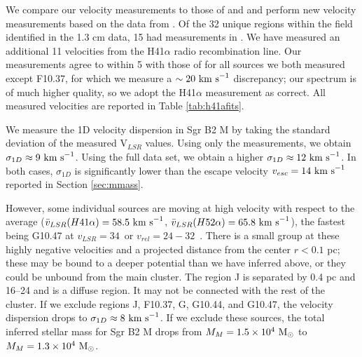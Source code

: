 \documentclass[twocolumn]{aastex62}
\begin{document}
We compare our velocity measurements to those of \citet{De-Pree2011a} and
\citet{De-Pree1996a} and perform  new velocity measurements based on the
data from \citet{Ginsburg2018a}.  Of the 32 unique \hii regions within the field
identified in the \citet{Gaume1995a} 1.3 cm data, 
15 had measurements in \citet{De-Pree2011a}.  We have measured an additional 11
velocities from the H41$\alpha$ radio recombination line.  Our measurements
agree to within 5 \kms with those of \citet{De-Pree2011a} for all sources we
both measured except F10.37, for which we measure a $\sim20~\textrm{km~s}^{-1}$ discrepancy;
our spectrum is of much higher quality, so we adopt the H41$\alpha$ measurement
as correct.  All measured velocities are reported in Table \ref{tab:h41afits}.

We measure the 1D velocity dispersion in Sgr B2 M by taking the standard
deviation of the measured V$_{LSR}$ values.  Using only the
\citet{De-Pree2011a} measurements, we obtain $\sigma_{1D}\approx9~\textrm{km~s}^{-1}$.  Using
the full data set, we obtain a higher $\sigma_{1D}\approx12~\textrm{km~s}^{-1}$.  In both
cases, $\sigma_{1D}$ is significantly lower than the escape velocity
$v_{esc}=14~\textrm{km~s}^{-1}$ reported in Section \ref{sec:mmass}.

However, some individual sources are moving at high velocity with respect to
the average ($\bar{v}_{LSR}(H41\alpha) = 58.5~\textrm{km~s}^{-1}$, $\bar{v}_{LSR}(H52\alpha)
= 65.8~\textrm{km~s}^{-1}$), the fastest being G10.47 at $v_{LSR}=34$~\kms or
$v_{rel}=24-32$~\kms.  There is a small group at these highly negative
velocities and a projected distance from the center $r<0.1$ pc; these may be
bound to a deeper potential than we have inferred above, or they could be unbound
from the main cluster.
The \hii region J is separated by 0.4 pc and 16--24 \kms and is a diffuse \hii
region.  It may not be connected with the rest of the cluster.
If we exclude regions J, F10.37, G, G10.44, and G10.47, the velocity dispersion
drops to $\sigma_{1D}\approx8~\textrm{km~s}^{-1}$.  If we exclude these sources, the total
inferred stellar mass for Sgr B2 M drops from $M_M = 1.5\times10^{4}~\mathrm{M}_{\odot}$ to
$M_M=1.3\times10^{4}~\mathrm{M}_{\odot}$.

\end{document}
